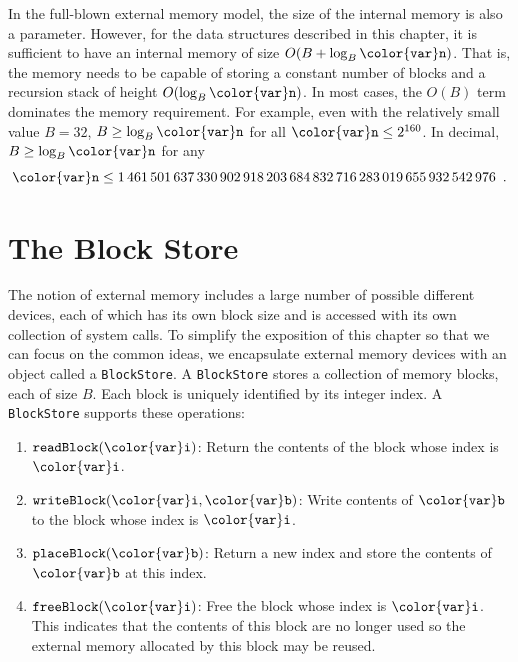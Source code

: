 \documentclass[10pt]{book}
\theoremstyle{plain}
\theoremstyle{definition}
\begin{document}
In the full-blown external memory model, the size of the internal
memory is also a parameter.  However, for the data structures described
in this chapter, it is sufficient to have an internal memory of size
$O(B+\log_B \ensuremath{\mathtt{{\color{var}n}}})$.  That is, the memory needs to be capable of storing
a constant number of blocks and a recursion stack of height $O(\log_B
\ensuremath{\mathtt{{\color{var}n}}})$.  In most cases, the $O(B)$ term dominates the memory requirement.
For example, even with the relatively small value $B=32$, $B\ge \log_B
\ensuremath{\mathtt{{\color{var}n}}}$ for all $\ensuremath{\mathtt{{\color{var}n}}}\le 2^{160}$.  In decimal, $B\ge \log_B \ensuremath{\mathtt{{\color{var}n}}}$ for any
\[
\ensuremath{\mathtt{{\color{var}n}}} \le 1\,461\,501\,637\,330\,902\,918\,203\,684\,832\,716\,283\,019\,655\,932\,542\,976 \enspace 
. \]

\section{The Block Store}

%
%
The notion of external memory includes a large number of possible
different devices, each of which has its own block size and is
accessed with its own collection of system calls.  To simplify the
exposition of this chapter so that we can focus on the common ideas, we
encapsulate external memory devices with an object called a \texttt{BlockStore}.
A \texttt{BlockStore} stores a collection of memory blocks, each of size $B$.
Each block is uniquely identified by its integer index.  A \texttt{BlockStore}
supports these operations:

\begin{enumerate}
  \item \ensuremath{\mathtt{readBlock({\color{var}i})}}: Return the contents of the block whose index is \ensuremath{\mathtt{{\color{var}i}}}.

  \item \ensuremath{\mathtt{writeBlock({\color{var}i},{\color{var}b})}}: Write contents of \ensuremath{\mathtt{{\color{var}b}}} to the block whose
    index is \ensuremath{\mathtt{{\color{var}i}}}.

  \item \ensuremath{\mathtt{placeBlock({\color{var}b})}}: Return a new index and store the contents of \ensuremath{\mathtt{{\color{var}b}}}
    at this index.

  \item \ensuremath{\mathtt{freeBlock({\color{var}i})}}: Free the block whose index is \ensuremath{\mathtt{{\color{var}i}}}.  This indicates
    that the contents of this block are no longer used so the external
    memory allocated by this block may be reused.
\end{enumerate}
\end{document}
